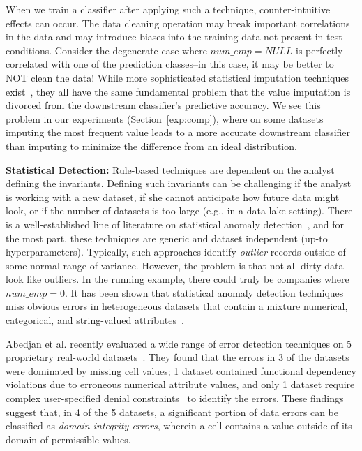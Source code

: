 When we train a classifier after applying such a technique, counter-intuitive effects can occur.  
The data cleaning operation may break important correlations in the data and may introduce biases into the training data not present in test conditions. 
Consider the degenerate case where $num\_emp = NULL$ is perfectly correlated with one of the prediction classes--in this case, it may be better to NOT clean the data!
While more sophisticated statistical imputation techniques exist~\cite{schafer1998multiple}, they all have the same fundamental problem that the value imputation is divorced from the downstream classifier's predictive accuracy. 
We see this problem in our experiments (Section~\ref{exp:comp}), where on some datasets imputing the most frequent value leads to a more accurate downstream classifier than imputing to minimize the difference from an ideal distribution.

\vspace{0.5em}\noindent\textbf{Statistical Detection: } Rule-based techniques are dependent on the analyst defining the invariants. Defining such invariants can be challenging if the analyst is working with a new dataset, if she cannot anticipate how future data might look, or if the number of datasets is too large (e.g., in a data lake setting).
There is a well-established line of literature on statistical anomaly detection~\cite{hellerstein2008quantitative}, and for the most part, these techniques are generic and dataset independent (up-to hyperparameters). Typically, such approaches identify \emph{outlier} records outside of some normal range of variance. However, the problem is that not all dirty data look like outliers. In the running example, there could truly be companies where $num\_emp = 0$. It has been shown that statistical anomaly detection techniques miss obvious errors in heterogeneous datasets that contain a mixture numerical, categorical, and string-valued attributes~\cite{DBLP:journals/pvldb/AbedjanCDFIOPST16}.

Abedjan et al. recently evaluated a wide range of error detection techniques on 5 proprietary real-world datasets~\cite{DBLP:journals/pvldb/AbedjanCDFIOPST16}.  They found that the errors in 3 of the datasets were dominated by missing cell values; 1 dataset contained functional dependency violations due to erroneous numerical attribute values, and only 1 dataset require complex user-specified denial constraints~\cite{chu2013discovering} to identify the errors.  These findings suggest that, in 4 of the 5 datasets, a significant portion of data errors can be classified as {\it domain integrity errors}, wherein a cell contains a value outside of its domain of permissible values.


